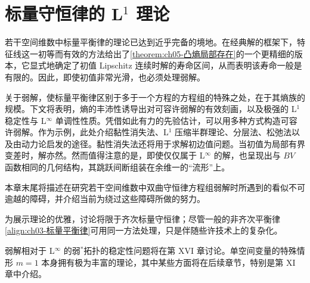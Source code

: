 \documentclass[../main.tex]{subfiles}
\begin{document}
\chapter{标量守恒律的 L$^{1}$ 理论}\label{chapter:ch06-标量守恒律L1理论}

若干空间维数中标量平衡律的理论已达到近乎完备的境地。在经典解的框架下，特征线这一初等而有效的方法给出了\cref{theorem:ch05-凸熵局部存在}的一个更精细的版本，它显式地确定了初值 Lipschitz 连续时解的寿命区间，从而表明该寿命一般是有限的。因此，即使初值非常光滑，也必须处理弱解。


关于弱解，使标量平衡律区别于多于一个方程的方程组的特殊之处，在于其熵族的规模。下文将表明，熵的丰沛性诱导出对可容许弱解的有效刻画，以及极强的 L$^{1}$ 稳定性与 L$^{\infty}$ 单调性性质。凭借如此有力的先验估计，可以用多种方式构造可容许弱解。作为示例，此处介绍黏性消失法、L$^{1}$ 压缩半群理论、分层法、松弛法以及由动力论启发的途径。黏性消失法还将用于求解初边值问题。当初值为局部有界变差时，解亦然。然而值得注意的是，即使仅仅属于 L$^{\infty}$ 的解，也呈现出与 $BV$ 函数相同的几何结构，其跳跃间断组装在余维一的“流形”上。

本章末尾将描述在研究若干空间维数中双曲守恒律方程组弱解时所遇到的看似不可逾越的障碍，并介绍当前为绕过这些障碍所做的努力。

为展示理论的优雅，讨论将限于齐次标量守恒律；尽管一般的非齐次平衡律\eqref{align:ch03-标量平衡律}可用同一方法处理，只是伴随些许技术上的复杂化。


弱解相对于 L$^{\infty}$ 的弱$^{*}$拓扑的稳定性问题将在第 XVI 章讨论。单空间变量的特殊情形 $m=1$ 本身拥有极为丰富的理论，其中某些方面将在后续章节，特别是第 XI 章中介绍。












\end{document}
